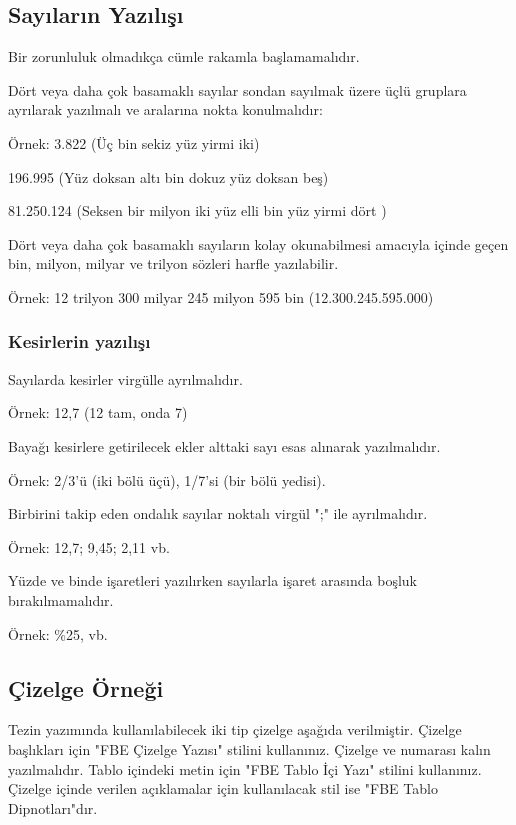 \subsection{Sayıların Yazılışı}
\noindent Bir zorunluluk olmadıkça cümle rakamla başlamamalıdır.

Dört veya daha çok basamaklı sayılar sondan sayılmak üzere üçlü gruplara ayrılarak yazılmalı ve aralarına nokta konulmalıdır:

Örnek: 3.822 (Üç bin sekiz yüz yirmi iki)

196.995 (Yüz doksan altı bin dokuz yüz doksan beş)

81.250.124 (Seksen bir milyon iki yüz elli bin yüz yirmi dört )

Dört veya daha çok basamaklı sayıların kolay okunabilmesi amacıyla içinde geçen bin, milyon, milyar ve trilyon sözleri harfle yazılabilir.

Örnek: 12 trilyon 300 milyar 245 milyon 595 bin (12.300.245.595.000)


\subsubsection{Kesirlerin yazılışı}
\noindent Sayılarda kesirler virgülle ayrılmalıdır.

Örnek: 12,7 (12 tam, onda 7)

Bayağı kesirlere getirilecek ekler alttaki sayı esas alınarak yazılmalıdır.

Örnek: 2/3’ü (iki bölü üçü), 1/7’si (bir bölü yedisi).

Birbirini takip eden ondalık sayılar noktalı virgül ";" ile ayrılmalıdır.

Örnek: 12,7; 9,45; 2,11 vb.

Yüzde ve binde işaretleri yazılırken sayılarla işaret arasında boşluk bırakılmamalıdır.

Örnek: \%25,  vb.


\subsection{Çizelge Örneği}
\noindent Tezin yazımında kullanılabilecek iki tip çizelge aşağıda verilmiştir. Çizelge başlıkları için "FBE Çizelge Yazısı" stilini kullanınız. Çizelge ve numarası kalın yazılmalıdır. Tablo içindeki metin için "FBE Tablo İçi Yazı" stilini kullanınız. Çizelge içinde verilen açıklamalar için kullanılacak stil ise "FBE Tablo Dipnotları"dır.

